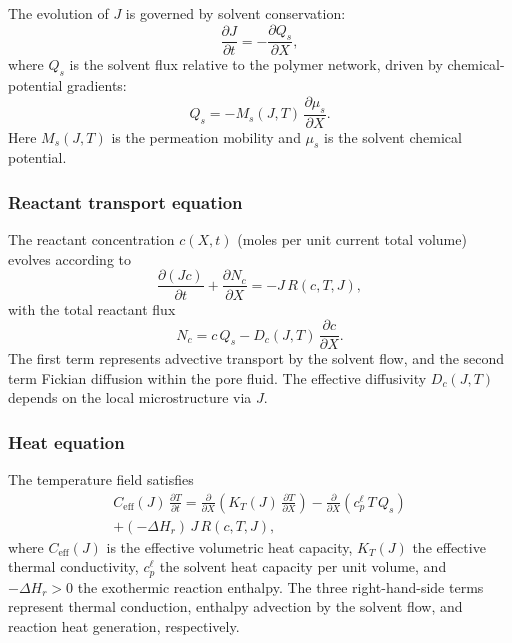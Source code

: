 The evolution of $J$ is governed by solvent conservation:
\begin{equation}
  \frac{\partial J}{\partial t} = -\frac{\partial Q_s}{\partial X},
  \label{eq:J_evol}
\end{equation}
where $Q_s$ is the solvent flux relative to the polymer network, driven by chemical-potential gradients:
\begin{equation}
  Q_s = -M_s(J,T)\,\frac{\partial \mu_s}{\partial X}.
  \label{eq:Qs}
\end{equation}
Here $M_s(J,T)$ is the permeation mobility and $\mu_s$ is the solvent chemical potential.

\subsubsection{Reactant transport equation}

The reactant concentration $c(X,t)$ (moles per unit current total volume) evolves according to
\begin{equation}
  \frac{\partial (Jc)}{\partial t}
  + \frac{\partial N_c}{\partial X}
  = -J\,R(c,T,J),
  \label{eq:c_evol}
\end{equation}
with the total reactant flux
\begin{equation}
  N_c = c\,Q_s - D_c(J,T)\,\frac{\partial c}{\partial X}.
  \label{eq:Nc}
\end{equation}
The first term represents advective transport by the solvent flow, and the second term Fickian diffusion within the pore fluid. The effective diffusivity $D_c(J,T)$ depends on the local microstructure via $J$.

\subsubsection{Heat equation}

The temperature field satisfies
\begin{multline}
  C_\mathrm{eff}(J)\,\frac{\partial T}{\partial t}
  = \frac{\partial}{\partial X}\!\left(K_T(J)\,\frac{\partial T}{\partial X}\right)
  - \frac{\partial}{\partial X}\!\left(c_p^\ell\,T\,Q_s\right)
  \\
  + (-\Delta H_r)\,J\,R(c,T,J),
  \label{eq:T_evol}
\end{multline}
where $C_\mathrm{eff}(J)$ is the effective volumetric heat capacity,
$K_T(J)$ the effective thermal conductivity, $c_p^\ell$ the solvent
heat capacity per unit volume, and $-\Delta H_r > 0$ the exothermic
reaction enthalpy.  The three right-hand-side terms represent thermal
conduction, enthalpy advection by the solvent flow, and reaction heat
generation, respectively.

